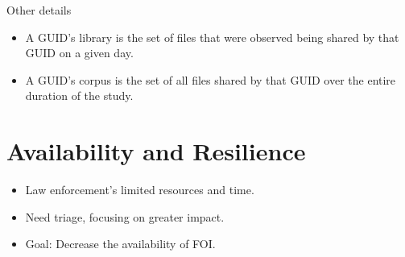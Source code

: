 \documentclass[notes]{beamer}
\begin{document}
\begin{frame}

\begin{block}{Other details}

\begin{itemize}

\item[\checkmark]A GUID’s library is the set of files that were observed being shared by that GUID on a given day. 

\item[\checkmark]A GUID’s corpus is the set of all files shared by that GUID over the entire duration of the study.


\end{itemize}

\end{block}

\end{frame}

\section{Availability and Resilience}
\begin{frame}

\begin{itemize}

\item[\checkmark]Law enforcement’s limited resources and time.

\item[\checkmark]Need triage, focusing on greater impact.

\item[\checkmark]Goal: Decrease the availability of FOI.

\end{itemize}

\end{frame}
\end{document}
